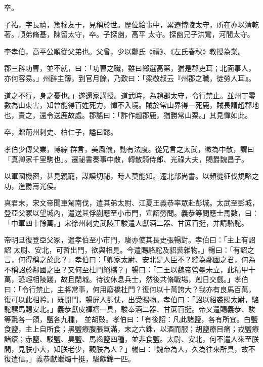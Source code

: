 \begin{pinyinscope}
 卒。



 子祐，字長禧，篤穆友于，見稱於世。歷位給事中，累遷博陵太守，所在亦以清乾著。順弟脩基，陳留太守，卒。子探幽，高平
 太守。探幽兄子洪鸞，河間太守。



 李孝伯，高平公順從父弟也。父曾，少以鄭氏《禮》、《左氏春秋》教授為業。



 郡三辟功曹，並不就，曰：「功曹之職，雖曰鄉選高第，猶是郡吏耳；北面事人，亦何容易。」州辟主簿，到官月餘，乃歎曰：「梁敬叔云『州郡之職，徒勞人耳』。



 道之不行，身之憂也。」遂還家講授。道武時，為趙郡太守，令行禁止。並州丁零數為山東害，知曾能得百姓死力，憚不入境。賊於常山界得一死鹿，賊長謂趙郡地也，責之，還令送鹿故處。郡謠曰：「詐作趙郡鹿，猶勝常山粟。」其見憚如此。



 卒，贈荊州刺史、柏仁子，謚曰懿。



 孝伯少傳父業，博綜
 群言，美風儀，動有法度。從兄言之太武，徵為中散，謂曰「真卿家千里駒也」。遷祕書奏事中散，轉散騎侍郎、光祿大夫，賜爵魏昌子。



 以軍國機密，甚見親寵，謀謨切祕，時人莫能知。遷北部尚書。以頻從征伐規略之功，進爵壽光侯。



 真君末，宋文帝聞車駕南伐，遣其弟太尉、江夏王義恭率眾赴彭城。太武至彭城，登亞父冢以望城內，遣送其俘蒯應至小市門，宣詔勞問。義恭等問應士馬數，曰：「中軍四十餘萬。」宋徐州刺史武陵王駿遣人獻酒二器、甘蔗百挺，并請駱駝。



 帝明旦復登亞父冢，遣孝伯至小市門，駿亦使其長史張暢對。孝伯曰：「主上有詔詔
 太尉、安北，可暫出門，欲與相見。今遣賜駱駝及貂裘雜物。」暢曰：「有詔之言，何得稱之於此？」孝伯曰：「卿家太尉、安北是人臣不？縱為鄰國之君，何為不稱詔於鄰國之臣？又何至杜門絕橋？」暢曰：「二王以魏帝營壘未立，此精甲十萬，恐輕相陵踐，故且閉城。待彼休息兵士，然後共脩戰場，剋日交戲。」孝伯曰：「令行禁止，主將常事，何用廢橋杜門？復何以十萬誇大？我亦有良馬百萬，復可以此相矜。」既開門，暢屏人卻仗，出受賜物。孝伯曰：「詔以貂裘賜太尉，駱駝騾馬賜安北。」義恭獻皮褲褶一具，駿奉酒二器、甘蔗百挺。帝又遣賜義恭、駿等氈各一領，鹽各九種，
 並胡豉。孝伯曰：「有後詔：凡此諸鹽，各有所宜。白鹽食鹽，主上自所食；黑鹽療腹脹氣滿，末之六銖，以酒而服；胡鹽療目痛；戎鹽療諸瘡；赤鹽、駁鹽、臭鹽、馬齒鹽四種，並非食鹽。太尉、安北，何不遣人來至朕間，見朕小大，知朕老少，觀朕為人？」暢曰：「魏帝為人，久為往來所具，故不復遣信。」義恭獻蠟燭十挺，駿獻錦一匹。




\end{pinyinscope}
